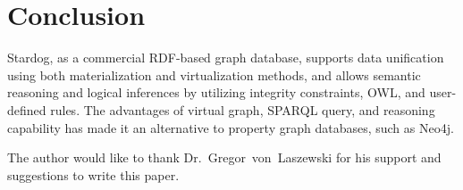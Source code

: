 \section{Conclusion}
Stardog, as a commercial RDF-based graph database, supports data 
unification using both materialization and virtualization methods, and allows 
semantic reasoning and logical inferences by utilizing integrity constraints, 
OWL, and user-defined rules. The advantages of virtual graph, SPARQL 
query, and reasoning capability has made it an alternative to property graph 
databases, such as Neo4j. 


\begin{acks}

  The author would like to thank Dr.~Gregor~von~Laszewski for his
  support and suggestions to write this paper.

\end{acks}


 

